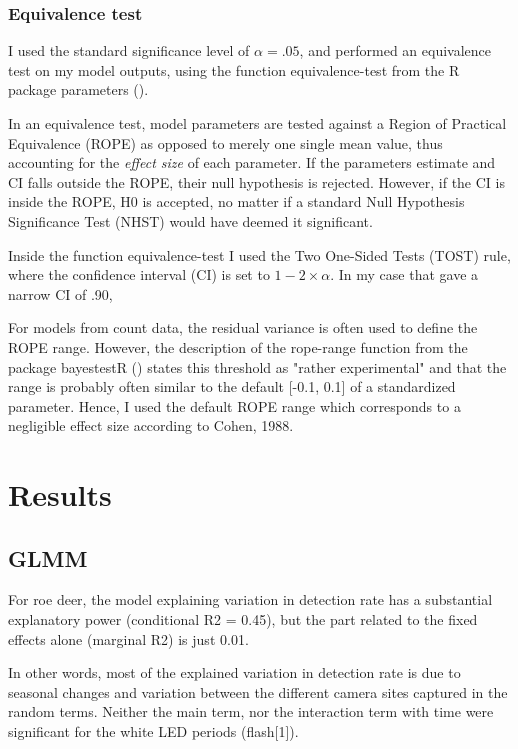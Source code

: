 



\subsection{Equivalence test}
I used the standard significance level of $\alpha = .05$, and performed an equivalence test on my model outputs, using the function equivalence-test from the R package parameters ().%

In an equivalence test, model parameters are tested against a Region of Practical Equivalence (ROPE) as opposed to merely one single mean value, thus accounting for the \emph{effect size} of each parameter.
If the parameters estimate and CI falls outside the ROPE, their null hypothesis is rejected. However, if the CI is inside the ROPE, H0 is accepted, no matter if a standard Null Hypothesis Significance Test (NHST) would have deemed it significant.

Inside the function equivalence-test I used the Two One-Sided Tests (TOST) rule, where the confidence interval (CI) is set to $1 - 2\times \alpha$. In my case that gave a narrow CI of .90,

For models from count data, the residual variance is often used to define the ROPE range. However, the description of the rope-range function from the package bayestestR () states this threshold as "rather experimental" and that the range is probably often similar to the default [-0.1, 0.1] of a standardized parameter.
Hence, I used the default ROPE range which corresponds to a negligible effect size according to Cohen, 1988.


\chapter{Results}

\section{GLMM}

For roe deer, the model explaining variation in detection rate has a substantial explanatory power (conditional R2 = 0.45), but the part related to the fixed effects alone (marginal R2) is just 0.01.

In other words, most of the explained variation in detection rate is due to seasonal changes and variation between the different camera sites captured in the random terms.
Neither the main term, nor the interaction term with time were significant for the white LED periods (flash[1]).

